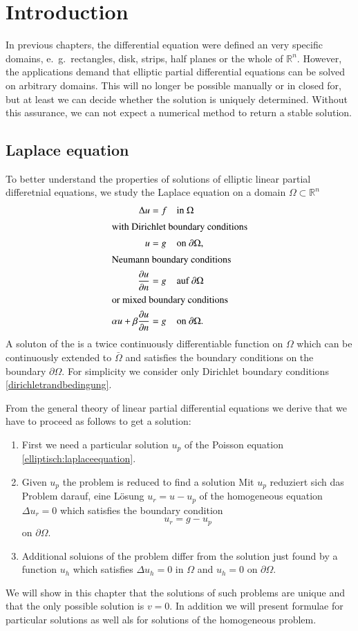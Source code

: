 %
%
%
\section{Introduction}
In previous chapters, the differential equation were defined an
very specific domains, e.~g.~rectangles, disk, strips, half planes or
the whole of $\mathbb R^n$.
However, the applications demand that elliptic partial differential
equations can be solved on arbitrary domains.
This will no longer be possible manually or in closed for, but at
least we can decide whether the solution is uniquely determined.
Without this assurance, we can not expect a numerical method to
return a stable solution.

\subsection{Laplace equation}
To better understand the properties of solutions of elliptic linear
partial differetnial equations, we study the Laplace equation
on a domain $\Omega\subset\mathbb R^n$
\begin{align}
\Delta u&=f &&\text{in $\Omega$}
\label{elliptisch:laplaceequation}
\\
\intertext{with Dirichlet boundary conditions}
u&=g && \text{on $\partial\Omega$},
\label{dirichletrandbedingung}
\\
\intertext{Neumann boundary conditions}
\frac{\partial u}{\partial n}&=g && \text{auf $\partial\Omega$}
\\
\intertext{or mixed boundary conditions}
\alpha u + \beta\frac{\partial u}{\partial n}&=g && \text{on $\partial\Omega$.}
\label{elliptisch:gemischt}
\end{align}
A soluton of the is a twice continuously differentiable function
on $\Omega$ which can be continuously extended to $\bar\Omega$
and satisfies the boundary conditions on the boundary $\partial\Omega$.
For simplicity we consider only Dirichlet boundary conditions
\eqref{dirichletrandbedingung}.

From the general theory of linear partial differential equations
we derive that we have to proceed as follows to get a solution:
\begin{enumerate}
\item
First we need a particular solution $u_p$ of the Poisson equation
\eqref{elliptisch:laplaceequation}.
\item
Given $u_p$ the problem is reduced to find a solution
Mit $u_p$ reduziert sich das Problem darauf, eine Lösung
$u_r=u-u_p$ of the homogeneous equation $\Delta u_r=0$ which
satisfies the boundary condition
\[
u_r=g-u_p
\]
on $\partial\Omega$.
\item
Additional soluions of the problem differ from the solution
just found by a function $u_h$ which satisfies
$\Delta u_h=0$ in $\Omega$ and $u_h=0$ on $\partial\Omega$.
\end{enumerate}
We will show in this chapter that the solutions of such problems
are unique and that the only possible solution is $v=0$.
In addition we will present formulae for particular solutions as well
als for solutions of the homogeneous problem.

